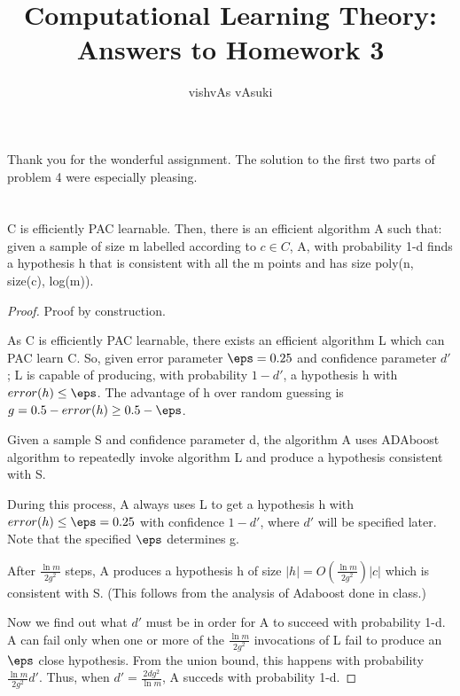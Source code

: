 \documentclass[10pt]{amsart}
\title{Computational Learning Theory: Answers to Homework 3}
\author{vishvAs vAsuki}
\begin{document}
\maketitle

\begin{rem}
 Thank you for the wonderful assignment. The solution to the first two parts of problem 4 were especially pleasing.
\end{rem}

\section{}
\begin{thm}
C is efficiently PAC learnable. Then, there is an efficient algorithm A such that: given a sample of size m labelled according to $c \in C$, A, with probability 1-d finds a hypothesis h that is consistent with all the m points and has size poly(n, size(c), log(m)).
\end{thm}
\begin{proof}
Proof by construction.

As C is efficiently PAC learnable, there exists an efficient algorithm L which can PAC learn C. So, given error parameter $\eps = 0.25$ and confidence parameter $d'$; L is capable of producing, with probability $1-d'$, a hypothesis h with $error(h) \leq \eps$. The advantage of h over random guessing is $g = 0.5 - error(h) \geq 0.5 - \eps$.

Given a sample S and confidence parameter d, the algorithm A uses ADAboost algorithm to repeatedly invoke algorithm L and produce a hypothesis consistent with S.

During this process, A always uses L to get a hypothesis h with $error(h) \leq \eps = 0.25$ with confidence $1-d'$, where $d'$ will be specified later. Note that the specified $\eps$ determines g.

After $\frac{\ln m}{2 g^{2}}$ steps, A produces a hypothesis h of size $|h| = O(\frac{\ln m}{2 g^{2}})|c|$ which is consistent with S. (This follows from the analysis of Adaboost done in class.)

Now we find out what $d'$ must be in order for A to succeed with probability 1-d. A can fail only when one or more of the $\frac{\ln m}{2 g^{2}}$ invocations of L fail to produce an $\eps$ close hypothesis. From the union bound, this happens with probability $\frac{\ln m}{2 g^{2}} d'$. Thus, when $d' = \frac{2d g^{2}}{\ln m}$, A succeds with probability 1-d.

\end{proof}
\end{document}
